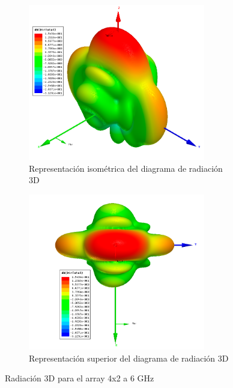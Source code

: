 \begin{figure}[H]
     \centering
     \begin{subfigure}[b]{0.7\textwidth}
         \centering
         \includegraphics[width=0.85\textwidth]{archivos/analisis/4x22/6}
         \caption{Representación isométrica del diagrama de radiación 3D}
         \label{fig:3d14x22}
     \end{subfigure}
     \hfill
     \begin{subfigure}[b]{0.7\textwidth}
         \centering
         \includegraphics[width=0.85\textwidth]{archivos/analisis/4x22/7}
         \caption{Representación superior del diagrama de radiación 3D}
         \label{fig:3d24x22}
     \end{subfigure}
     \hfill
        \caption{Radiación 3D para el array 4x2 a 6 GHz}
        \label{fig:3d4x22}
\end{figure}

